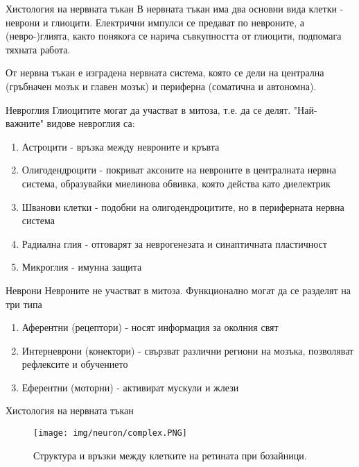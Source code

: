 \begin{frame}[t]{Хистология на нервната тъкан}
  В нервната тъкан има два основни вида клетки - неврони и глиоцити.
  Електрични импулси се предават по невроните, а (невро-)глията,
  както понякога се нарича съвкупността от глиоцити, подпомага тяхната работа.

  От нервна тъкан е изградена нервната система, която се дели на централна (гръбначен мозък и главен мозък) и периферна (соматична и автономна).
\end{frame}

\begin{frame}[t]{Невроглия}
  Глиоцитите могат да участват в митоза, т.е. да се делят. "Най-важните" видове невроглия са:
  \begin{enumerate}
    \item Астроцити - връзка между невроните и кръвта
    \item Олигодендроцити - покриват аксоните на невроните в централната нервна система, образувайки миелинова обвивка, която действа като диелектрик
    \item Шванови клетки - подобни на олигодендроцитите, но в периферната нервна система
    \item Радиална глия - отговарят за неврогенезата и синаптичната пластичност
    \item Микроглия - имунна защита
  \end{enumerate}
\end{frame}

\begin{frame}[t]{Неврони}
  Невроните не участват в митоза. Функционално могат да се разделят на три типа
  \begin{enumerate}
    \item Аферентни (рецептори) - носят информация за околния свят
    \item Интерневрони (конектори) - свързват различни региони на мозъка, позволяват рефлексите и обучението
    \item Еферентни (моторни) - активират мускули и жлези
  \end{enumerate}
\end{frame}

\begin{frame}[t]{Хистология на нервната тъкан}
  \begin{figure}[htbp!]
    \centering
    \texttt{[image: img/neuron/complex.PNG]}
    \caption{Структура и връзки между клетките на ретината при бозайници. \cite[Фиг 1.2]{Neuron}}
  \end{figure}
\end{frame}

